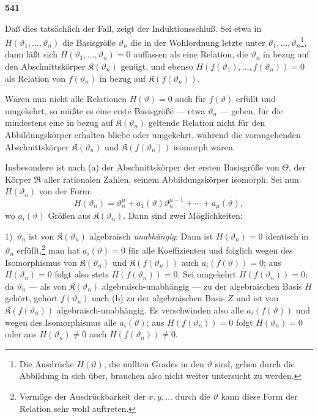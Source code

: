 \documentclass[12pt,a4paper]{article}
\begin{document}
\newpage
\begin{center}
\textbf{541}
\end{center}

Da\ss{} dies tats\"achlich der Fall, zeigt der Induktionsschlu\ss{}. Sei etwa in $H(\vartheta_1, \ldots, \vartheta_n)$ die Basisgr\"o\ss e $\vartheta_n$ die in der Wohlordnung letzte unter $\vartheta_1, \ldots, \vartheta_n$\footnote{Die Ausdr\"ucke $H(\vartheta)$, die nullten Grades in den $\vartheta$ sind, gehen durch die Abbildung in sich \"uber, brauchen also nicht weiter untersucht zu werden.}, dann l\"a\ss t sich $H(\vartheta_1, \ldots, \vartheta_n) = 0$ auffassen als eine Relation, die $\vartheta_n$ in bezug auf den Abschnittsk\"orper $\mathfrak{K}(\vartheta_n)$ gen\"ugt, und ebenso $H(f(\vartheta_1), \ldots, f(\vartheta_n)) = 0$ als Relation von $f(\vartheta_n)$ in bezug auf $\mathfrak{K}(f(\vartheta_n))$.

W\"aren nun nicht alle Relationen $H(\vartheta) = 0$ auch f\"ur $f(\vartheta)$ erf\"ullt und umgekehrt, so m\"u\ss te es eine erste Basisgr\"o\ss e --- etwa $\vartheta_n$ --- geben, f\"ur die mindestens eine in bezug auf $\mathfrak{K}(\vartheta_n)$ geltende Relation nicht f\"ur den Abbildungsk\"orper erhalten bliebe oder umgekehrt, w\"ahrend die vorangehenden Abschnittsk\"orper $\mathfrak{K}(\vartheta_n)$ und $\mathfrak{K}(f(\vartheta_n))$ isomorph w\"aren.

Insbesondere ist nach (a) der Abschnittsk\"orper der ersten Basisgr\"o\ss e von $\Theta$, der K\"orper $\mathfrak{R}$ aller rationalen Zahlen, seinem Abbildungsk\"orper isomorph. Sei nun $H(\vartheta_n)$ von der Form:
\[H(\vartheta_n) = \vartheta_n^{\mu} + a_1(\vartheta) \vartheta_n^{\mu-1} + \cdots + a_{\mu}(\vartheta),\]
wo $a_i(\vartheta)$ Gr\"o\ss en aus $\mathfrak{K}(\vartheta_n)$. Dann sind zwei M\"oglichkeiten:

1)\ $\vartheta_n$ ist von $\mathfrak{K}(\vartheta_n)$ algebraisch \emph{unabh\"angig}: Dann ist $H(\vartheta_n) = 0$ identisch in $\vartheta_n$ erf\"ullt,\footnote{Verm\"oge der Ausdr\"uckbarkeit der $x, y, \ldots$ durch die $\vartheta$ kann diese Form der Relation sehr wohl auftreten.} man hat $a_i(\vartheta) = 0$ f\"ur alle Koeffizienten und folglich wegen des Isomorphismus von $\mathfrak{K}(\vartheta_n)$ und $\mathfrak{K}(f(\vartheta_n))$ auch $a_i(f(\vartheta)) = 0$; aus $H(\vartheta_n) = 0$ folgt also stets $H(f(\vartheta_n)) = 0$. Sei umgekehrt $H(f(\vartheta_n)) = 0$; da $\vartheta_n$ --- als von $\mathfrak{K}(\vartheta_n)$ algebraisch-unabh\"angig --- zu der algebraischen Basis $H$ geh\"ort, geh\"ort $f(\vartheta_n)$ nach (b) zu der algebraischen Basis $Z$ und ist von $\mathfrak{K}(f(\vartheta_n))$ algebraisch-unabh\"angig. Es verschwinden also alle $a_i(f(\vartheta))$ und wegen des Isomorphismus alle $a_i(\vartheta)$; aus $H(f(\vartheta_n)) = 0$ folgt $H(\vartheta_n) = 0$ oder aus $H(\vartheta_n) \neq 0$ auch $H(f(\vartheta_n)) \neq 0$.
\end{document}
